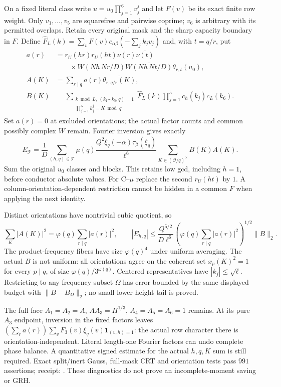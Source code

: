 \documentclass[11pt,oneside,openany]{book}
\theoremstyle{definition}\newtheorem{definition}[theorem]{Definition}
\theoremstyle{remark}\newtheorem{remark}[theorem]{Remark}
\begin{document}
On a fixed literal class write $u=u_0\prod_{j=1}^6v_j^j$ and let $F(v)$
be its exact finite row weight. Only $v_1,\ldots,v_5$ are squarefree and
pairwise coprime; $v_6$ is arbitrary with its permitted overlaps.
Retain every original mask and the sharp capacity boundary in $F$.
Define $\widehat F_L(k)=\sum_vF(v)e_{\alpha\beta}(-\sum_jk_jv_j)$ and,
with $t=q/r$, put
\begin{align*}
 a(r)&=r_U(hr)r_U(ht)\nu(r)\overline{\nu(t)}\\
 &\qquad{}\times W(Nh\,Nr/D)\overline{W(Nh\,Nt/D)}\theta_{r,t}(u_0),\\
 A(K)&=\sum_{r\mid q}a(r)\overline{\theta_{r,q/r}(K)},\\
 B(K)&=\sum_{\substack{k\bmod L,\ (k_1\cdots k_5,q)=1\\
                   \prod_{j=1}^5k_j^j=K\bmod q}}
       \widehat F_L(k)\prod_{j=1}^5c_h(k_j)c_L(k_6).
\end{align*}
Set $a(r)=0$ at excluded orientations; the actual factor counts and
common possibly complex $W$ remain. Fourier inversion gives exactly
\begin{equation}\label{jdq:joint}
 E_{\mathcal T}=\frac1D\sum_{(h,q)\in\mathcal T}
 \mu(q)\frac{Q^2\xi_q(-\alpha)\tau_\beta(\xi_q)}{\ell^6}
 \sum_{K\in(\mathcal O/q)^\times}B(K)A(K).
\end{equation}
Sum the original $u_0$ classes and blocks. This retains low gcd,
including $h=1$, before conductor absolute values. For C--$\mu$ replace
the second $r_U(ht)$ by $1$. A column-orientation-dependent restriction
cannot be hidden in a common $F$ when applying the next identity.

Distinct orientations have nontrivial cubic quotient, so
\[
 \sum_K|A(K)|^2=\varphi(q)\sum_{r\mid q}|a(r)|^2,\qquad
 |E_{h,q}|\le\frac{Q^{5/2}}{D\ell^6}
  \left(\varphi(q)\sum_{r\mid q}|a(r)|^2\right)^{1/2}\|B\|_2.
\]
The product-frequency fibers have size $\varphi(q)^4$ under uniform
averaging. The actual $B$ is not uniform: all orientations agree on
the coherent set $x_p(K)^2=1$ for every $p\mid q$, of size
$\varphi(q)/3^{\omega(q)}$. Centered representatives have
$|k_j|\le\sqrt\ell$. Restricting to any frequency subset $\Omega$ has
error bounded by the same displayed budget with $\|B-B_\Omega\|_2$;
no small lower-height tail is proved.

The full face $A_1=A_2=A$, $AA_3=H^{1/3}$, $A_4=A_5=A_6=1$ remains.
At its pure $A_3$ endpoint, inversion in the fixed factors leaves
$(\sum_ra(r))\sum_vF_3(v)\xi_q(v)\mathbf1_{(v,h)=1}$:
the actual row character there is orientation-independent. Literal
length-one Fourier factors can undo complete phase balance.
A quantitative signed estimate for the actual $h,q,K$ sum is still
required. Exact split/inert Gauss, full-mask CRT and orientation tests
pass $991$ assertions; receipt:
.
These diagnostics do not prove an incomplete-moment saving or GRH.
\end{document}
